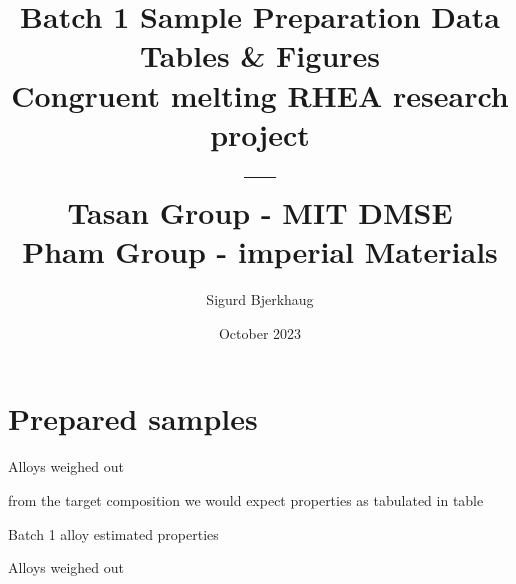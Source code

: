 \documentclass[a4]{article}
\title{Batch 1 Sample Preparation Data Tables \& Figures \\ Congruent melting RHEA research project \\ ---\\Tasan Group - MIT DMSE \\ Pham Group - imperial Materials \\}
\author{Sigurd Bjerkhaug}
\date{October 2023}
\begin{document}
\maketitle

\newpage




\section{Prepared samples}

\begin{table}[h]
    \centering
    \caption{Alloys weighed out}
    
    \label{tab:Batch1 mesured}
\end{table}

from the target composition we would expect properties as tabulated in table
\begin{table}[h]
    \centering
    \caption{Batch 1 alloy estimated properties}
    
    \label{tab:Batch1 mesured}
\end{table}


\begin{table}[h]
    \centering
    \caption{Alloys weighed out}
    
    \label{tab:Batch1 mesured}
\end{table}
\end{document}
